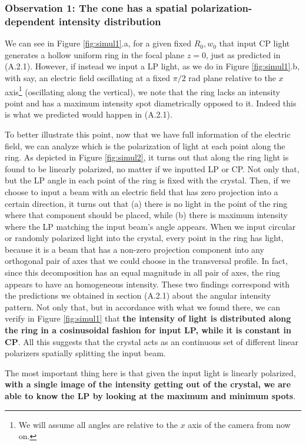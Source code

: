 \documentclass[11pt, a4paper, twoside]{article} %
\begin{document}
\subsubsection*{Observation 1: The cone has a spatial polarization-dependent intensity distribution}
We can see in Figure \ref{fig:simul1}.a, for a given fixed $R_0,w_0$ that input CP light generates a hollow uniform ring in the focal plane $z=0$, just as predicted in (A.2.1). However, if instead we input a LP light, as we do in Figure \ref{fig:simul1}.b, with say, an electric field oscillating at a fixed $\pi/2$ rad plane relative to the $x$ axis\footnote{We will assume all angles are relative to the $x$ axis of the camera from now on.} (oscillating along the vertical), we note that the ring lacks an intensity point and has a maximum intensity spot diametrically opposed to it. Indeed this is what we predicted would happen in (A.2.1). 

To better illustrate this point, now that we have full information of the electric field, we can analyze which is the polarization of light at each point along the ring. As depicted in Figure \ref{fig:simul2}, it turns out that along the ring light is found to be linearly polarized, no matter if we inputted LP or CP. Not only that, but the LP angle in each point of the ring is fixed with the crystal. Then, if we choose to input a beam with an electric field that has zero projection into a certain direction, it turns out that (a) there is no light in the point of the ring where that component should be placed, while (b) there is maximum intensity where the LP matching the input beam's angle appears. When we input circular or randomly polarized light into the crystal, every point in the ring has light, because it is a beam that has a non-zero projection component into any orthogonal pair of axes that we could choose in the transversal profile. In fact, since this decomposition has an equal magnitude in all pair of axes, the ring appears to have an homogeneous intensity. These two findings correspond with the predictions we obtained in section (A.2.1) about the angular intensity pattern. Not only that, but in accordance with what we found there, we can verify in Figure \ref{fig:simul1} that {\bf the intensity of light is distributed along the ring in a cosinusoidal fashion for input LP, while it is constant in CP}. All this suggests that the crystal acts as an continuous set of different linear polarizers spatially splitting the input beam.

The most important thing here is that given the input light is linearly polarized, {\bf with a single image of the intensity getting out of the crystal, we are able to know the LP by looking at the maximum and minimum spots}.\vspace{0.2cm}
\end{document}
